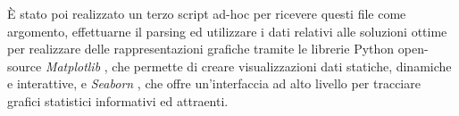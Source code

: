 È stato poi realizzato un terzo script ad-hoc per ricevere questi file come argomento, effettuarne il parsing ed utilizzare i dati relativi alle 
soluzioni ottime per realizzare delle rappresentazioni grafiche tramite le librerie Python open-source \textit{Matplotlib} \cite{matplotlib}, 
che permette di creare visualizzazioni dati statiche, dinamiche e interattive, e \textit{Seaborn} \cite{seaborn}, che offre un'interfaccia ad 
alto livello per tracciare grafici statistici informativi ed attraenti.